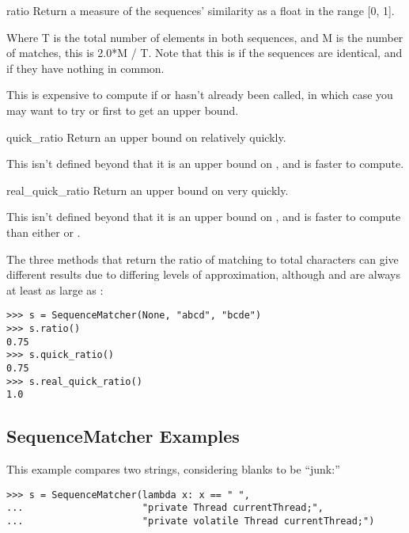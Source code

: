\begin{methoddesc}{ratio}{}
  Return a measure of the sequences' similarity as a float in the
  range [0, 1].

  Where T is the total number of elements in both sequences, and M is
  the number of matches, this is 2.0*M / T. Note that this is
   if the sequences are identical, and  if they
  have nothing in common.

  This is expensive to compute if  or
   hasn't already been called, in which case you
  may want to try  or
   first to get an upper bound.
\end{methoddesc}

\begin{methoddesc}{quick_ratio}{}
  Return an upper bound on  relatively quickly.

  This isn't defined beyond that it is an upper bound on
  , and is faster to compute.
\end{methoddesc}

\begin{methoddesc}{real_quick_ratio}{}
  Return an upper bound on  very quickly.

  This isn't defined beyond that it is an upper bound on
  , and is faster to compute than either
   or .
\end{methoddesc}

The three methods that return the ratio of matching to total characters
can give different results due to differing levels of approximation,
although  and  are always
at least as large as :

\begin{verbatim}
>>> s = SequenceMatcher(None, "abcd", "bcde")
>>> s.ratio()
0.75
>>> s.quick_ratio()
0.75
>>> s.real_quick_ratio()
1.0
\end{verbatim}


\subsection{SequenceMatcher Examples \label{sequencematcher-examples}}


This example compares two strings, considering blanks to be ``junk:''

\begin{verbatim}
>>> s = SequenceMatcher(lambda x: x == " ",
...                     "private Thread currentThread;",
...                     "private volatile Thread currentThread;")
\end{verbatim}

